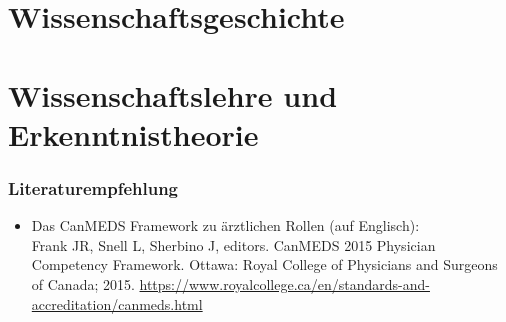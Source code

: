 \documentclass{beamer}
\begin{document}
\section{Wissenschaftsgeschichte}




\section{Wissenschaftslehre und Erkenntnistheorie}




\begin{frame}

\frametitle{Literaturempfehlung}

\begin{itemize}
    \item 
    Das CanMEDS Framework zu ärztlichen Rollen (auf Englisch):  \\
    Frank JR, Snell L, Sherbino J, editors. CanMEDS 2015 Physician
Competency Framework. Ottawa: Royal College of Physicians
and Surgeons of Canada; 2015.  \url{https://www.royalcollege.ca/en/standards-and-accreditation/canmeds.html}
\end{itemize}


\end{frame}



\end{document}
